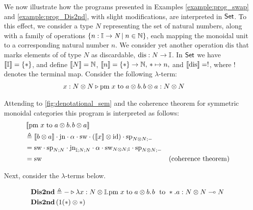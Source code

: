 \begin{example}
  We now illustrate how the programs presented in Examples \ref{example:prog_swap} and \ref{example:prog_Dis2nd}, with slight modifications, are interpreted in $\mathsf{Set}$.
   To this effect, we consider a type $N$ representing the set of natural numbers, along with a family of operations $\{n : \mathbb{I} \to \emph{N} \mid n \in \mathbb{N}\}$, each mapping the monoidal unit to a corresponding natural number $n$.
   We consider yet another operation $\text{dis}$ that marks elements of of type $N$ as discardable, $\text{dis}: N \to \mathbb{I} $.
  In $\mathsf{Set}$ we have $\left \llbracket \mathbb{I} \right \rrbracket= \{*\}$, and define $\left \llbracket N \right \rrbracket = \mathbb{N}$,   $\left \llbracket n \right \rrbracket = \{*\} \to \mathbb{N}, \, * \mapsto n,$ and $\left \llbracket \text{dis} \right \rrbracket=!$, where $!$ denotes the terminal map. 
   Consider the following $\lambda$-term:
   \begin{equation*}
   \begin{split}
    &   x : N \otimes N \triangleright \text{pm} \hspace{3 pt} x \hspace{3 pt} \text{to} \hspace{3 pt} a \otimes b. \hspace{1pt} b \otimes a : N \otimes N 
  \end{split}
  \end{equation*}
  
   Attending to \autoref{fig:denotational_sem} and the coherence theorem for symmetric monoidal categories this program is interpreted as follows:
   \begin{align*}
   &  \left \llbracket  \text{pm} \hspace{3 pt} x \hspace{3 pt} \text{to} \hspace{3 pt} a \otimes b. \hspace{1pt} b \otimes a  \right \rrbracket \\
   & \triangleq \left \llbracket b \otimes a \right \rrbracket \cdot \mathrm{jn} \cdot \alpha \cdot \mathrm{sw} \cdot \left( \left \llbracket x \right \rrbracket \otimes \mathrm{id}\right) \cdot \mathrm{sp}_{N \otimes N;-}   \\
   & = \mathrm{sw} \cdot \mathrm{sp}_{N;N} \cdot \mathrm{jn}_{\mathbb{I}; N; N} \cdot \alpha \cdot \mathrm{sw}_{N \otimes N;\mathbb{I}} \cdot \mathrm{sp}_{N \otimes N;-} \\
   & = \mathrm{sw}  & ( \text{coherence theorem}) 
   \end{align*}

   Next, consider the  $\lambda$-terms below.

   \begin{equation*}
    \begin{split}
    & \textbf{Dis2nd} \triangleq - \triangleright \lambda x: N \otimes \mathbb{I}. \text{pm} \hspace{3 pt} x \hspace{3 pt} \text{to} \hspace{3 pt} a \otimes b. \hspace{1 pt} b \hspace{3 pt} \text{ to } *.a: N \otimes N \multimap N \\
    & \textbf{Dis2nd} \,(1 (*) \otimes *) \\
    \end{split}
   \end{equation*}


\end{example}
